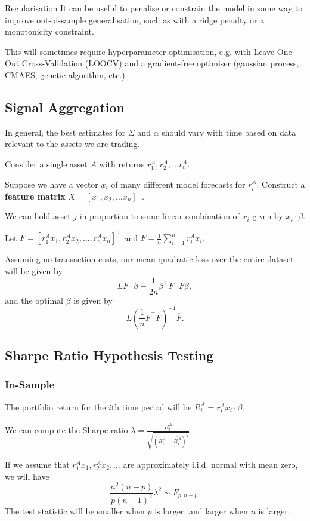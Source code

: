\documentclass{article}
\begin{document}
\begin{block}{Regularisation}
	It can be useful to penalise or constrain the model in some way to improve out-of-sample generalisation, such as with a ridge penalty or a monotonicity constraint.

	This will sometimes require hyperparameter optimisation, e.g. with Leave-One-Out Cross-Validation (LOOCV) and a gradient-free optimiser (gaussian process, CMAES, genetic algorithm, etc.).
\end{block}

\subsection{Signal Aggregation}
In general, the best estimates for $\Sigma$ and $\alpha$ should vary with time based on data relevant to the assets we are trading.

Consider a single asset $A$ with returns $r_1^A,r_2^A,\ldots r_n^A$.

Suppose we have a vector $x_i$ of many different model forecasts for $r_i^A$. Construct a \textbf{feature matrix} $X = [x_1,x_2,\ldots x_n]^\top$.

We can hold asset $j$ in proportion to some linear combination of $x_i$ given by $x_i\cdot\beta$.

Let $F=[r_1^A x_1, r_2^A x_2,\ldots, r_n^A x_n]^\top$ and $\overline{F} = \frac{1}{n} \sum_{i=1}^n r_i^A x_i$.

Assuming no transaction costs, our mean quadratic loss over the entire dataset will be given by
$$L \overline{F} \cdot \beta - \frac{1}{2n}\beta^\top F^\top F\beta,$$
and the optimal $\beta$ is given by
$$L\left(\frac{1}{n}F^\top F\right)^{-1}\overline{F}.$$

\subsection{Sharpe Ratio Hypothesis Testing }
\subsubsection{In-Sample}
The portfolio return for the $i$th time period will be $R_i^A = r_i^A x_i \cdot \beta$.

We can compute the Sharpe ratio $\lambda = \frac{\overline{R_i^A}}{\sqrt{\overline{(R_i^A - \overline{R_i^A})^2}}}$.

If we assume that $r_1^A x_1,r_2^A x_2,\ldots$ are approximately i.i.d. normal with mean zero, we will have
$$\frac{n^2(n-p)}{p(n-1)^2}\lambda^2 \sim F_{p,n-p}.$$
The test statistic will be smaller when $p$ is larger, and larger when $n$ is larger.%
\end{document}
